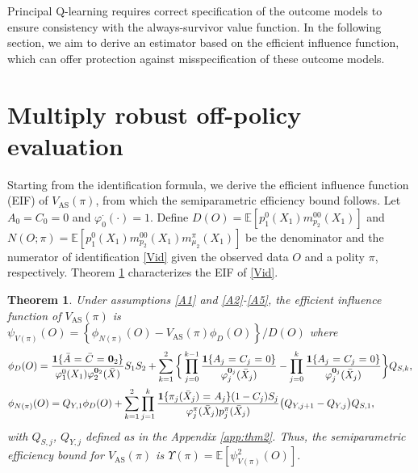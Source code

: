 \documentclass{article}
\newcommand{\pk}{{\varphi}}
\newcommand{\E}{\mathbb{E}}
\newcommand{\tred}{{}}   %
\newtheorem{theorem}{Theorem}
\begin{document}
Principal Q-learning requires correct specification of the outcome models to ensure consistency with the always-survivor value function. 
In the following section, we aim to derive an estimator based on the efficient influence function, which can offer protection against misspecification of these outcome models.


%
%
\section{Multiply robust off-policy evaluation}
Starting from the identification formula, we derive the efficient influence function (EIF) of $V_{\text{AS}}(\pi)$, from which the semiparametric efficiency bound follows. 
\tred{Let $A_0=C_0=0$ and $\varphi_0^{\cdot}(\cdot)=1$. Define $D(O) = \E[p_1^0(X_1) m_{p_2}^{00}(X_1)]$ and $N(O;\pi) = \E[p_1^0(X_1) m_{p_2}^{00}(X_1) m_{\mu_2}^{\pi}(X_1)]$ be the denominator and the numerator of identification \eqref{Vid} given the observed data $O$ and a polity $\pi$, respectively. Theorem \ref{thm:2} characterizes the EIF of \eqref{Vid}.}

\begin{theorem} \label{thm:2}
	Under assumptions \ref{A1} and \ref{A2}-\ref{A5}, the efficient influence function of $V_{\text{AS}}(\pi)$ is $\mathcal \psi_{V(\pi)}(O) = \left\{ \phi_{N(\pi)}(O) - V_{\text{AS}}(\pi) \phi_D(O) \right\} / D(O)$ where
	\tred{
	\begin{align*}
		&\phi_D(O)
		 = \frac{\mathbf{1}\{\bar A\textrm{ = }\bar C\textrm{ = }{\bf 0}_2\}}{\pk_1^{0}(X_1)\pk_2^{{\bf 0}_2}(\bar X)} S_1S_2 + \sum_{k=1}^2 
		   \bigg\{ \prod_{j=0}^{k-1} \frac{\mathbf{1}\{A_j\textrm{ = }C_j\textrm{ = }0\}}{\pk_j^{{\bf 0}_j}(\bar X_j)} - \prod_{j=0}^k \frac{\mathbf{1}\{A_j\textrm{ = }C_j\textrm{ = }0\}}{\pk_j^{{\bf 0}_j}(\bar X_j)} \bigg\} Q_{S,k}, \\
		&\phi_{N(\pi)}(O) 
		= Q_{Y,1} \phi_D(O) + \sum_{k=1}^2 \prod_{j=1}^k \frac{\mathbf1\{\pi_j(\bar X_j)\textrm{ = }A_j\}(1-C_j)S_j}{\pk_j^{\pi}(\bar X_j)p_j^{\pi}(\bar X_j)} \big(Q_{Y,j+1} - Q_{Y,j}\big) Q_{S,1}
		,
	\end{align*}
	with $Q_{S,j}$, $Q_{Y,j}$ defined as in the Appendix \ref{app:thm2}.
	}
	Thus, the semiparametric efficiency bound for $V_{\text{AS}}(\pi)$ is $\Upsilon(\pi) = \E\left[ \mathcal \psi_{V(\pi)}^2(O) \right].$
\end{theorem}
	
\end{document}
